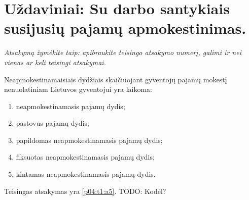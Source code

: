 \chapter{Uždaviniai: Su darbo santykiais susijusių pajamų apmokestinimas.}

\begin{tasks}

  \emph{Atsakymą žymėkite taip: apibraukite teisingo atsakymo numerį,
  galimi ir nei vienas ar keli teisingi atsakymai.}
  
  \begin{task}
    \begin{condition}
      Neapmokestinamaisiais dydžiais skaičiuojant gyventojų pajamų
      mokestį nenuolatiniam Lietuvos gyventojui yra laikoma:
      \begin{enumerate}
        \item neapmokestinamasis pajamų dydis;
        \item pastovus pajamų dydis;
        \item papildomas neapmokestinamasis pajamų dydis;
        \item fiksuotas neapmokestinamasis pajamų dydis;
        \item \label{p04:t1:a5} kintamas neapmokestinamasis pajamų dydis.
      \end{enumerate}
    \end{condition}
    \begin{solution}
      Teisingas atsakymas yra \ref{p04:t1:a5}. TODO: Kodėl?
    \end{solution}
  \end{task}


\end{tasks}
